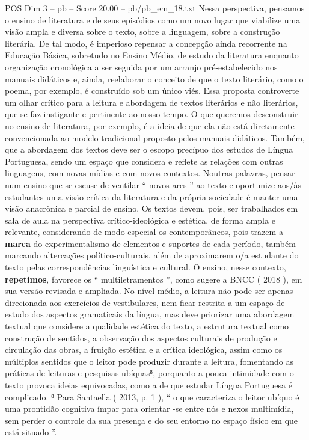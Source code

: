 \begin{textsample}{POS Dim 3 – pb – Score 20.00 – pb/pb\_em\_18.txt}
Nessa perspectiva, pensamos o ensino de literatura e de seus episódios como um novo lugar que viabilize uma visão ampla e diversa sobre o texto, sobre a linguagem, sobre a construção literária.
De tal modo, é imperioso repensar a concepção ainda recorrente na Educação Básica, sobretudo no Ensino Médio, de estudo da literatura enquanto organização cronológica a ser seguida por um arranjo pré-estabelecido nos manuais didáticos e, ainda, reelaborar o conceito de que o texto literário, como o poema, por exemplo, é construído sob um único viés.
Essa proposta controverte um olhar crítico para a leitura e abordagem de textos literários e não literários, que se faz instigante e pertinente ao nosso tempo.
O que queremos desconstruir no ensino de literatura, por exemplo, é a ideia de que ela não está diretamente convencionada ao modelo tradicional proposto pelos manuais didáticos.
Também, que a abordagem dos textos deve ser o escopo precípuo dos estudos de Língua Portuguesa, sendo um espaço que considera e reflete as relações com outras linguagens, com novas mídias e com novos contextos.
Noutras palavras, pensar num ensino que se escuse de ventilar “ novos ares ” ao texto e oportunize aos/às estudantes uma visão crítica da literatura e da própria sociedade é manter uma visão anacrônica e parcial de ensino.
Os textos devem, pois, ser trabalhados em sala de aula na perspectiva crítico-ideológica e estética, de forma ampla e relevante, considerando de modo especial os contemporâneos, pois trazem a \textbf{marca} do experimentalismo de elementos e suportes de cada período, também marcando altercações político-culturais, além de aproximarem o/a estudante do texto pelas correspondências linguística e cultural.
O ensino, nesse contexto, \textbf{repetimos}, favorece os “ multiletramentos ”, como sugere a BNCC ( 2018 ), em sua versão revisada e ampliada.
No nível médio, a leitura não pode ser apenas direcionada aos exercícios de vestibulares, nem ficar restrita a um espaço de estudo dos aspectos gramaticais da língua, mas deve priorizar uma abordagem textual que considere a qualidade estética do texto, a estrutura textual como construção de sentidos, a observação dos aspectos culturais de produção e circulação das obras, a fruição estética e a crítica ideológica, assim como os múltiplos sentidos que o leitor pode produzir durante a leitura, fomentando as práticas de leituras e pesquisas ubíquas⁸, porquanto a pouca intimidade com o texto provoca ideias equivocadas, como a de que estudar Língua Portuguesa é complicado. ⁸ Para Santaella ( 2013, p. 1 ), “ o que caracteriza o leitor ubíquo é uma prontidão cognitiva ímpar para orientar -se entre nós e nexos multimídia, sem perder o controle da sua presença e do seu entorno no espaço físico em que está situado ”.

\end{textsample}
